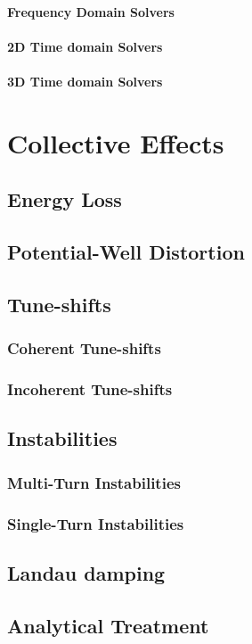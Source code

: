 \documentclass[
	12pt,				%
	openright,			%
	oneside,			%
	a4paper,		%
	chapter=TITLE,		%
	section=TITLE,		%
    brazil,				%
	english,			%
	sumario=tradicional,
	]{abntex2}
\begin{document}
      \subsubsection{Frequency Domain Solvers}
      \subsubsection{2D Time domain Solvers}
      \subsubsection{3D Time domain Solvers}

\chapter{Collective Effects}
  \section{Energy Loss}
  \section{Potential-Well Distortion}
  \section{Tune-shifts}
    \subsection{Coherent Tune-shifts}
    \subsection{Incoherent Tune-shifts}
  \section{Instabilities}
    \subsection{Multi-Turn Instabilities}
    \subsection{Single-Turn Instabilities}
  \section{Landau damping}
  \section{Analytical Treatment}
\end{document}
